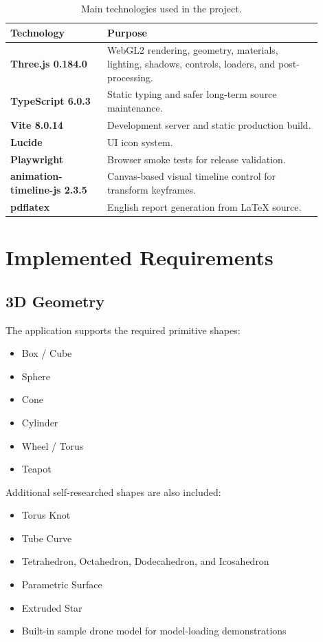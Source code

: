 \documentclass[12pt,a4paper]{article}
\begin{document}
\begin{table}[h]
\centering
\begin{tabular}{>{\bfseries}p{0.28\linewidth}p{0.62\linewidth}}
\toprule
Technology & Purpose \\
\midrule
Three.js 0.184.0 & WebGL2 rendering, geometry, materials, lighting, shadows, controls, loaders, and post-processing. \\
TypeScript 6.0.3 & Static typing and safer long-term source maintenance. \\
Vite 8.0.14 & Development server and static production build. \\
Lucide & UI icon system. \\
Playwright & Browser smoke tests for release validation. \\
animation-timeline-js 2.3.5 & Canvas-based visual timeline control for transform keyframes. \\
pdflatex & English report generation from LaTeX source. \\
\bottomrule
\end{tabular}
\caption{Main technologies used in the project.}
\end{table}

\section{Implemented Requirements}

\subsection{3D Geometry}

The application supports the required primitive shapes:
\begin{itemize}
  \item Box / Cube
  \item Sphere
  \item Cone
  \item Cylinder
  \item Wheel / Torus
  \item Teapot
\end{itemize}

Additional self-researched shapes are also included:
\begin{itemize}
  \item Torus Knot
  \item Tube Curve
  \item Tetrahedron, Octahedron, Dodecahedron, and Icosahedron
  \item Parametric Surface
  \item Extruded Star
  \item Built-in sample drone model for model-loading demonstrations
\end{itemize}
\end{document}
